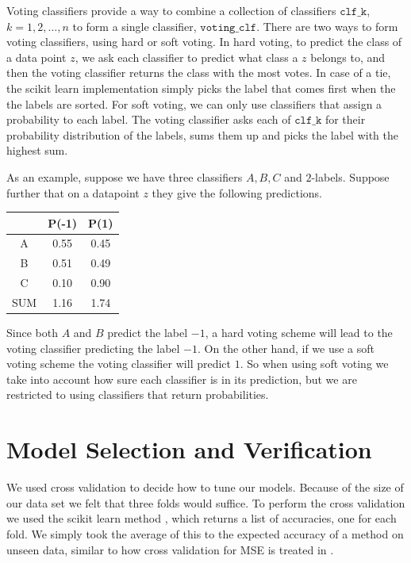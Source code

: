 \documentclass[parskip=half]{scrartcl}
\theoremstyle{definition}
\theoremstyle{remark}
\newcommand{\funcname}[1]{{\color{blue}{\texttt{#1}}}}
\newcommand{\varname}[1]{\texttt{#1}}
\begin{document}
Voting classifiers provide a way to combine a collection of classifiers $\varname{clf\_k}$, $k=1,2,\ldots,n$ to form a single classifier, $\varname{voting\_clf}$. 
There are two ways to form voting classifiers, using hard or soft voting. 
In hard voting, to predict the class of a data point $z$, we ask each classifier to predict what class a $z$ belongs to, and then the voting classifier returns the class with the most votes. 
In case of a tie, the scikit learn implementation simply picks the label that comes first when the the labels are sorted. 
For soft voting, we can only use classifiers that assign a probability to each label. 
The voting classifier asks each of $\varname{clf\_k}$ for their probability distribution of the labels, sums them up and picks the label with the highest sum. 

As an example, suppose we have three classifiers $A,B,C$ and $2$-labels. 
Suppose further that on a datapoint $z$ they give the following predictions.

\begin{center}
\begin{tabular}{c|cc}
 & P(-1) & P(1) \\ 
\hline
\hline 
A & 0.55 & 0.45 \\ 
B & 0.51 & 0.49 \\ 
C & 0.10 & 0.90 \\ 
SUM & 1.16 & 1.74
\end{tabular} 
\end{center}

Since both $A$ and $B$ predict the label $-1$, a hard voting scheme will lead to the voting classifier predicting the label $-1$.
On the other hand, if we use a soft voting scheme the voting classifier will predict $1$.
So when using soft voting  we take into account how sure each classifier is in its prediction, but we are restricted to using classifiers that return probabilities.  

\section{Model Selection and Verification}

We used cross validation to decide how to tune our models. 
Because of the size of our data set we felt that three folds would suffice.
To perform the cross validation we used the scikit learn method \funcname{cross\_val\_score}, which returns a list of accuracies, one for each fold. 
We simply took the average of this to the expected accuracy of a method on unseen data, similar to how cross validation for MSE is treated in \cite[Chapter 7.10]{htf:esl}.
\end{document}
